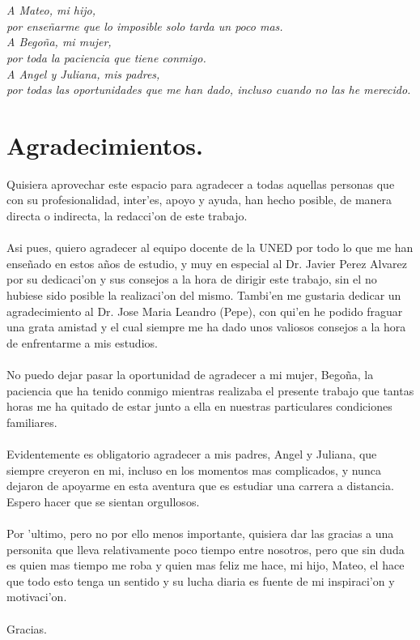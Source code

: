 \documentclass[a4paper,openright,12pt]{book}
\numberwithin{equation}{section} %
\begin{document}
\chapter*{}
\begin{flushright}
\textit{A Mateo, mi hijo, \\
por ense\~narme que lo imposible solo tarda un poco mas.\\
A Bego\~na, mi mujer, \\
por toda la paciencia que tiene conmigo.\\
A Angel y Juliana, mis padres, \\
por todas las oportunidades que me han dado, incluso cuando no las he merecido.}
\end{flushright}
\chapter*{Agradecimientos.} 
Quisiera aprovechar este espacio para agradecer a todas aquellas personas que con su profesionalidad, inter'es, apoyo y ayuda, han hecho posible, de manera directa o indirecta, la redacci'on de este trabajo. \\
\\
Asi pues, quiero agradecer al equipo docente de la UNED por todo lo que me han ense\~nado en estos a\~nos de estudio, y muy en especial al Dr. Javier Perez Alvarez por su dedicaci'on y sus consejos a la hora de dirigir este trabajo, sin el no hubiese sido posible la realizaci'on del mismo. Tambi'en me gustaria dedicar un agradecimiento al Dr. Jose Maria Leandro (Pepe), con qui'en he podido fraguar una grata amistad y el cual siempre me ha dado unos valiosos consejos a la hora de enfrentarme a mis estudios.\\
\\
No puedo dejar pasar la oportunidad de agradecer a mi mujer, Bego\~na, la paciencia que ha tenido conmigo mientras realizaba el presente trabajo que tantas horas me ha quitado de estar junto a ella en nuestras particulares condiciones familiares.\\
\\
Evidentemente es obligatorio agradecer a mis padres, Angel y Juliana, que siempre creyeron en mi, incluso en los momentos mas complicados, y nunca dejaron de apoyarme en esta aventura que es estudiar una carrera a distancia. Espero hacer que se sientan orgullosos.\\
\\
Por 'ultimo, pero no por ello menos importante, quisiera dar las gracias a una personita que lleva relativamente poco tiempo entre nosotros, pero que sin duda es quien mas tiempo me roba y quien mas feliz me hace, mi hijo, Mateo, el hace que todo esto tenga un sentido y su lucha diaria es fuente de mi inspiraci'on y motivaci'on.\\
\\
Gracias.
\end{document}
